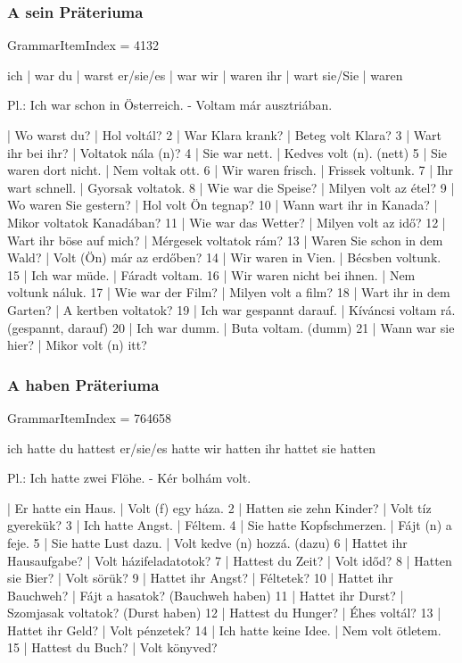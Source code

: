 \documentclass{article}
\newenvironment{desc}{\verbatim}{\endverbatim}
\newenvironment{exmp}{\verbatim}{\endverbatim}
\begin{document}
\subsubsection{A sein Präteriuma}

GrammarItemIndex = 4132

\begin{desc}
ich       | war
du        | warst
er/sie/es | war
wir       | waren
ihr       | wart
sie/Sie   | waren

Pl.: Ich war schon in Österreich. - Voltam már ausztriában.
\end{desc}

\begin{exmp}
1 | Wo warst du? | Hol voltál?
2 | War Klara krank? | Beteg volt Klara?
3 | Wart ihr bei ihr? | Voltatok nála (n)?
4 | Sie war nett. | Kedves volt (n). (nett)
5 | Sie waren dort nicht. | Nem voltak ott.
6 | Wir waren frisch. | Frissek voltunk.
7 | Ihr wart schnell. | Gyorsak voltatok.
8 | Wie war die Speise? | Milyen volt az étel?
9 | Wo waren Sie gestern? | Hol volt Ön tegnap?
10 | Wann wart ihr in Kanada? | Mikor voltatok Kanadában?
11 | Wie war das Wetter? | Milyen volt az idő?
12 | Wart ihr böse auf mich? | Mérgesek voltatok rám?
13 | Waren Sie schon in dem Wald? | Volt (Ön) már az erdőben?
14 | Wir waren in Vien. | Bécsben voltunk.
15 | Ich war müde. | Fáradt voltam.
16 | Wir waren nicht bei ihnen. | Nem voltunk náluk.
17 | Wie war der Film? | Milyen volt a film?
18 | Wart ihr in dem Garten? | A kertben voltatok?
19 | Ich war gespannt darauf. | Kíváncsi voltam rá. (gespannt, darauf)
20 | Ich war dumm. | Buta voltam. (dumm)
21 | Wann war sie hier? | Mikor volt (n) itt?
\end{exmp}

\subsubsection{A haben Präteriuma}

GrammarItemIndex = 764658

\begin{desc}
ich hatte
du hattest
er/sie/es hatte
wir hatten
ihr hattet
sie hatten

Pl.: Ich hatte zwei Flöhe. - Kér bolhám volt.
\end{desc}

\begin{exmp}
1 | Er hatte ein Haus. | Volt (f) egy háza.
2 | Hatten sie zehn Kinder? | Volt tíz gyerekük?
3 | Ich hatte Angst. | Féltem.
4 | Sie hatte Kopfschmerzen. | Fájt (n) a feje.
5 | Sie hatte Lust dazu. | Volt kedve (n) hozzá. (dazu)
6 | Hattet ihr Hausaufgabe? | Volt házifeladatotok?
7 | Hattest du Zeit? | Volt időd?
8 | Hatten sie Bier? | Volt sörük?
9 | Hattet ihr Angst? | Féltetek?
10 | Hattet ihr Bauchweh? | Fájt a hasatok? (Bauchweh haben)
11 | Hattet ihr Durst? | Szomjasak voltatok? (Durst haben)
12 | Hattest du Hunger? | Éhes voltál?
13 | Hattet ihr Geld? | Volt pénzetek?
14 | Ich hatte keine Idee. | Nem volt ötletem.
15 | Hattest du Buch? | Volt könyved?
\end{exmp}
\end{document}
